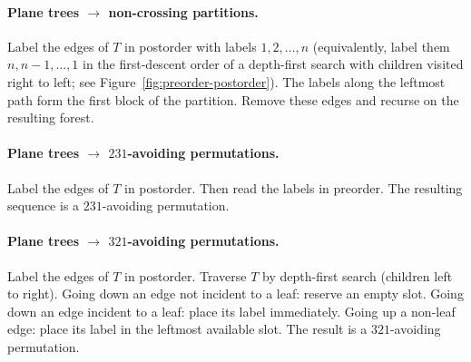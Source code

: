 \documentclass[a4paper,11pt]{article}
\theoremstyle{definition}
\begin{document}
\paragraph{Plane trees $\to$ non-crossing
  partitions.}
Label the edges of $T$ in postorder with labels
$1, 2, \ldots, n$ (equivalently, label them
$n, n{-}1, \ldots, 1$ in the first-descent order of a
depth-first search with children visited right to left;
see Figure~\ref{fig:preorder-postorder}).
The labels along the leftmost path form the first block
of the partition. Remove these edges and recurse on the
resulting forest.

\paragraph{Plane trees $\to$ $231$-avoiding
  permutations.}
Label the edges of $T$ in postorder. Then read the labels
in preorder. The resulting sequence is a $231$-avoiding
permutation.

\paragraph{Plane trees $\to$ $321$-avoiding
  permutations.}
Label the edges of $T$ in postorder. Traverse $T$ by
depth-first search (children left to right). Going down
an edge not incident to a leaf: reserve an empty slot.
Going down an edge incident to a leaf: place its label
immediately. Going up a non-leaf edge: place its label in
the leftmost available slot. The result is a
$321$-avoiding permutation.
\end{document}
